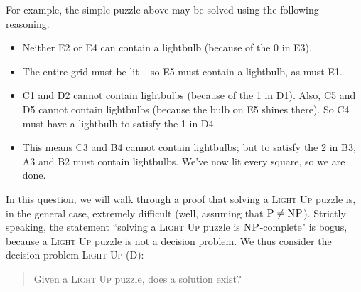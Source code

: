 \documentclass[12pt, a4paper]{article}
\begin{document}
For example, the simple puzzle above may be solved using the following reasoning.
\begin{itemize}
\item Neither E2 or E4 can contain a lightbulb (because of the 0 in E3).
\item The entire grid must be lit -- so E5 must contain a lightbulb, as must E1.
\item C1 and D2 cannot contain lightbulbs (because of the 1 in D1). Also, C5 and D5
cannot contain lightbulbs (because the bulb on E5 shines there). So C4 must have a lightbulb to satisfy the 1 in D4.
\item This means C3 and B4 cannot contain lightbulbs; but to satisfy the 2 in B3,
A3 and B2 must contain lightbulbs. We've now lit every square, so we are done.
\end{itemize}

\noindent In this question, we will walk through a proof that solving a \textsc{Light Up}
puzzle is, in the general case, extremely difficult (well, assuming that 
$\textsc{P} \neq \textsc{NP}$). Strictly speaking, the statement ``solving a \textsc{Light 
Up} puzzle is $\textsc{NP}$-complete" is bogus, because a \textsc{Light Up} puzzle is not 
a decision problem. We thus consider the decision problem \textsc{Light Up (D)}:

\begin{quote}
Given a \textsc{Light Up} puzzle, does a solution exist?
\end{quote}
\end{document}
